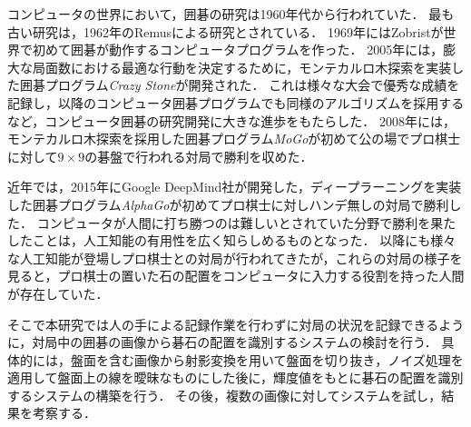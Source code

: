 \documentclass[openright]{nitocs}
\numberwithin{equation}{section}
\begin{document}
        コンピュータの世界において，囲碁の研究は1960年代から行われていた．
        最も古い研究は，1962年のRemusによる研究\cite{Remus}とされている．
        1969年にはZobristが世界で初めて囲碁が動作するコンピュータプログラムを作った\cite{Zobrist}．
        2005年には，膨大な局面数における最適な行動を決定するために，モンテカルロ木探索を実装した囲碁プログラム{\it Crazy Stone}\cite{CrazyStone}が開発された．
        これは様々な大会で優秀な成績を記録し，以降のコンピュータ囲碁プログラムでも同様のアルゴリズムを採用するなど，コンピュータ囲碁の研究開発に大きな進歩をもたらした．
        2008年には，モンテカルロ木探索を採用した囲碁プログラム{\it MoGo}が初めて公の場でプロ棋士に対して$9\times9$の碁盤で行われる対局で勝利を収めた\cite{mogo}．
        
        近年では，2015年にGoogle DeepMind社が開発した，ディープラーニングを実装した囲碁プログラム{\it AlphaGo}\cite{AlphaGo}が初めてプロ棋士に対しハンデ無しの対局で勝利した．
        コンピュータが人間に打ち勝つのは難しいとされていた分野で勝利を果たしたことは，人工知能の有用性を広く知らしめるものとなった．
        以降にも様々な人工知能が登場しプロ棋士との対局が行われてきたが，これらの対局の様子を見ると，プロ棋士の置いた石の配置をコンピュータに入力する役割を持った人間が存在していた．

        そこで本研究では人の手による記録作業を行わずに対局の状況を記録できるように，対局中の囲碁の画像から碁石の配置を識別するシステムの検討を行う．
        具体的には，盤面を含む画像から射影変換を用いて盤面を切り抜き，ノイズ処理を適用して盤面上の線を曖昧なものにした後に，輝度値をもとに碁石の配置を識別するシステムの構築を行う．
        その後，複数の画像に対してシステムを試し，結果を考察する．
\end{document}
